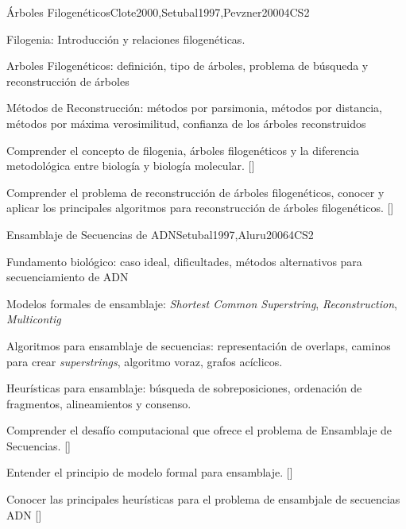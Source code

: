 \begin{syllabus}
\begin{unit}{Árboles Filogenéticos}{}{Clote2000,Setubal1997,Pevzner2000}{4}{CS2}
\begin{topics}
    \item Filogenia: Introducción y relaciones filogenéticas.
    \item Arboles Filogenéticos: definición, tipo de árboles, problema de búsqueda y reconstrucción de árboles
    \item Métodos de Reconstrucción: métodos por parsimonia, métodos por distancia, métodos por máxima verosimilitud, confianza de los árboles reconstruidos
\end{topics}

\begin{learningoutcomes}
    \item  Comprender el concepto de filogenia, árboles filogenéticos y la diferencia metodológica entre biología y biología molecular. [\Familiarity]
    \item Comprender el problema de reconstrucción de árboles filogenéticos, conocer y aplicar los principales algoritmos para reconstrucción de árboles filogenéticos. [\Assessment]
\end{learningoutcomes}
\end{unit}

\begin{unit}{Ensamblaje de Secuencias de ADN}{}{Setubal1997,Aluru2006}{4}{CS2}
\begin{topics}
    \item Fundamento biológico: caso ideal, dificultades, métodos alternativos para secuenciamiento de ADN
    \item Modelos formales de ensamblaje: \textit{Shortest Common Superstring}, \textit{Reconstruction}, \textit{Multicontig}
    \item Algoritmos para ensamblaje de secuencias: representación de overlaps, caminos para crear \textit{superstrings}, algoritmo voraz, grafos acíclicos.
    \item Heurísticas para ensamblaje: búsqueda de sobreposiciones, ordenación de fragmentos, alineamientos y consenso.
\end{topics}

\begin{learningoutcomes}
    \item Comprender el desafío computacional que ofrece el problema de Ensamblaje de Secuencias. [\Familiarity]
    \item Entender el principio de modelo formal para ensamblaje. [\Assessment]
    \item Conocer las principales heurísticas para el problema de ensambjale de secuencias ADN [\Usage]
\end{learningoutcomes}
\end{unit}


\end{syllabus}
